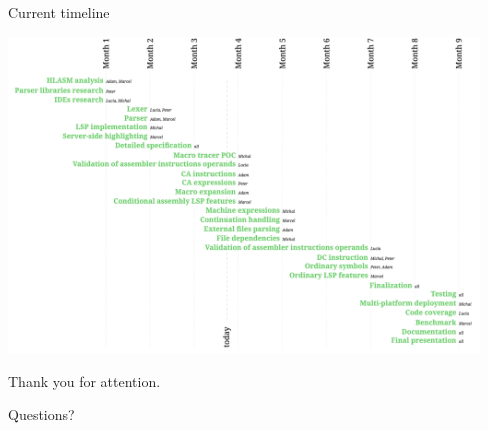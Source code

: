 \documentclass[10pt]{beamer}
\begin{document}
\begin{frame}{Current timeline}

\centering
\hspace*{-0.95cm}
\includegraphics[width=12.5cm]{img/timeline}

\end{frame}


\begin{frame}[standout]

  Thank you for attention.

  \small Questions?
\end{frame}
\end{document}
